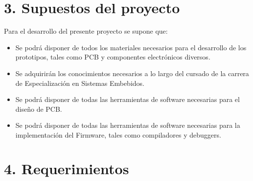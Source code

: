 \documentclass[11pt]{charter}
\begin{document}
\section{3. Supuestos del proyecto}
\label{sec:supuestos}

Para el desarrollo del presente proyecto se supone que:

\begin{itemize}
\item Se podrá disponer de todos los materiales necesarios para el desarrollo de los prototipos, tales como PCB y componentes electrónicos diversos.
\item Se adquirirán los conocimientos necesarios a lo largo del cursado de la carrera de Especialización en Sistemas Embebidos.
\item Se podrá disponer de todas las herramientas de software necesarias para el diseño de PCB.
\item Se podrá disponer de todas las herramientas de software necesarias para la implementación del Firmware, tales como compiladores y debuggers.
\end{itemize}


\section{4. Requerimientos}
\label{sec:requerimientos}
\end{document}
